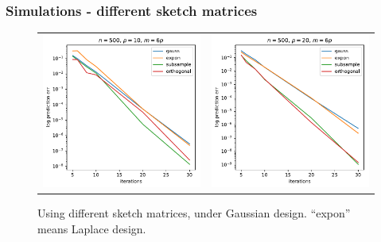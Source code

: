 \documentclass{beamer}
\begin{document}
\begin{frame}
    \frametitle{Simulations - different sketch matrices}
    \begin{figure}
        \begin{center}
            \begin{tabular}{ll}
                \includegraphics[scale=0.32]{diff_sketch_mat_err_vs_iter_n500_p10_m60.pdf}
                &
                \includegraphics[scale=0.32]{diff_sketch_mat_err_vs_iter_n500_p20_m120.pdf}
            \end{tabular}
            \caption{Using different sketch matrices, under Gaussian design. ``expon'' means
            Laplace design.}
        \end{center}
    \end{figure}
\end{frame}
\end{document}
